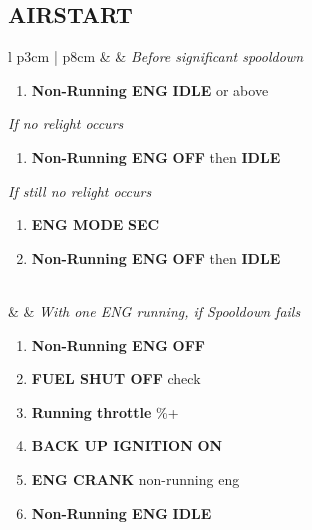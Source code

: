 \documentclass[fontHelvetica]{TechCheck}
\begin{document}
	\subsection{AIRSTART}
	\begin{center}
		\begin{longtable}{l p{3cm} | p{8cm}}
			\toprule
			\textbf{\textbf{\textbullet}} &  & \emph{Before significant spooldown}
			\begin{minipage}[t]{\linewidth}
				\vspace{-7pt}
				\begin{enumerate}
					\item \textbf{Non-Running ENG} \dotfill \textbf{IDLE} or above
				\end{enumerate}
				\vspace{1em}
				\emph{If no relight occurs}
				\begin{enumerate}[resume]
					\vspace{-7pt}
					\item \textbf{Non-Running ENG} \dotfill \textbf{OFF} then \textbf{IDLE}
				\end{enumerate}
				\emph{If still no relight occurs}
				\begin{enumerate}[resume]
					\vspace{-7pt}
					\item \textbf{ENG MODE} \dotfill \textbf{SEC}
					\item \textbf{Non-Running ENG} \dotfill \textbf{OFF} then \textbf{IDLE}
				\end{enumerate}
			\end{minipage} \\
			\midrule
			\textbf{\textbf{\textbullet}} &  &
			\emph{With one ENG running, if Spooldown fails}
			\begin{minipage}[t]{\linewidth}
				\vspace{-7pt}
				\begin{enumerate}
					\item \textbf{Non-Running ENG} \dotfill \textbf{OFF}
					\item \textbf{FUEL SHUT OFF} \dotfill check
					\item \textbf{Running throttle} \%+
					\item \textbf{BACK UP IGNITION} \dotfill \textbf{ON}
					\item \textbf{ENG CRANK} \dotfill non-running eng
					\item \textbf{Non-Running ENG} \dotfill \textbf{IDLE}

\end{enumerate}
\end{minipage}
\end{longtable}
\end{center}
\end{document}
